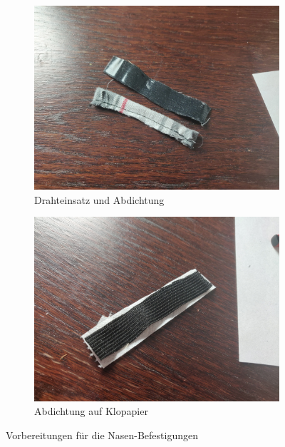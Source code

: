 \documentclass[12pt,parskip=full]{scrartcl}
\begin{document}
\begin{figure}[ht]
    \vspace{0.5cm}
    \centering
    \begin{subfigure}{0.48\textwidth}
        \centering
        \includegraphics[width = \linewidth]{Pictures/09_NoseParts/NoseParts01_resized.jpg}
        \caption{Drahteinsatz und Abdichtung}
        \label{Nose01}
    \end{subfigure}
    \begin{subfigure}{0.48\textwidth}
        \centering
        \includegraphics[width = \linewidth]{Pictures/09_NoseParts/NoseParts02_resized.jpg}
        \caption{Abdichtung auf Klopapier}
        \label{Nose02}
    \end{subfigure}
    \caption{Vorbereitungen für die Nasen-Befestigungen}
    \label{NosePrep}
\end{figure}
\end{document}
